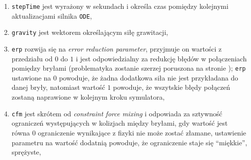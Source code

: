 	\begin {enumerate}
	 \item \texttt{stepTime} jest wyrażony w sekundach i określa czas pomiędzy kolejnymi aktualizacjami silnika \texttt{ODE},
	 \item \texttt{gravity} jest wektorem określającym siłę grawitacji,
	 \item \texttt{erp} rozwija się na \textit{error reduction parameter}, przyjmuje on wartości z przedziału od $0$ do $1$ i jest odpowiedzialny za redukcję błędów w połączeniach pomiędzy bryłami
	  (problematyka zostanie szerzej poruszona na stronie \pageref{fig:joints}); \texttt{erp} ustawione na $0$ powoduje, że żadna dodatkowa siła nie jest przykładana do danej bryły, natomiast wartość $1$
	 powoduje, że wszytskie błędy połączeń zostaną naprawione w kolejnym kroku symulatora,
	 \item \texttt{cfm} jest skrótem od \textit{constraint force mixing} i odpowiada za sztywność ograniczeń występujących w kolizjach między bryłami, gdy wartość jest równa $0$ ograniczenie wynikające z fizyki
nie może zostać złamane, ustawienie parametru na wartość dodatnią powoduje, że ograniczenie staje się ``miękkie'', sprężyste,
	  

\end{enumerate}
